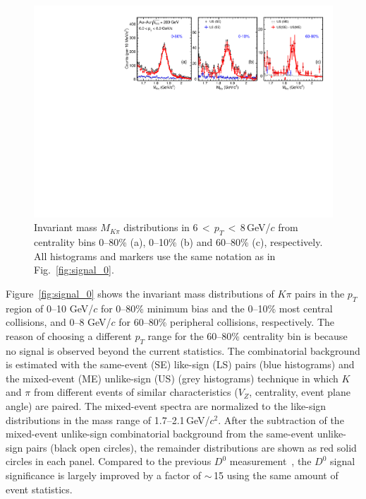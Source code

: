 \documentclass[%
 reprint,	
showpacs,
 amsmath,amssymb,
 aps,
 prc,
]{revtex4-1}
\begin{document}
\begin{figure}
\centering
\includegraphics[width=1.0\textwidth]{fig/signal_6_8GeV.pdf}
\caption{Invariant mass $M_{K\pi}$ distributions in 6\,$<$\,$p_{T}$\,$<$\,8\,GeV/$c$ from centrality bins 0--80\% (a), 0--10\% (b) and 60--80\% (c), respectively. All histograms and markers use the same notation as in Fig.~\ref{fig:signal_0}.}
\label{fig:signal_2} 
\end{figure}

Figure~\ref{fig:signal_0} shows the invariant mass distributions of $K\pi$ pairs in the $p_{T}$ region of 0--10 GeV/$c$ for 0--80\% minimum bias and the 0--10\% most central collisions, and 0--8 GeV/$c$ for 60--80\% peripheral collisions, respectively. The reason of choosing a different $p_T$ range for the 60--80\% centrality bin is because no signal is observed beyond the current statistics. The combinatorial background is estimated with the same-event (SE) like-sign (LS) pairs (blue histograms) and the mixed-event (ME) unlike-sign (US) (grey histograms) technique in which $K$ and $\pi$ from different events of similar characteristics ($V_{Z}$, centrality, event plane angle) are paired. The mixed-event spectra are normalized to the like-sign distributions in the mass range of 1.7--2.1\,GeV/$c^2$. After the subtraction of the mixed-event unlike-sign combinatorial background from the same-event unlike-sign pairs (black open circles), the remainder distributions are shown as red solid circles in each panel. Compared to the previous $D^0$ measurement~\cite{Star_D_RAA}, the $D^0$ signal significance is largely improved by a factor of $\sim$\,15 using the same amount of event statistics. 
\end{document}
